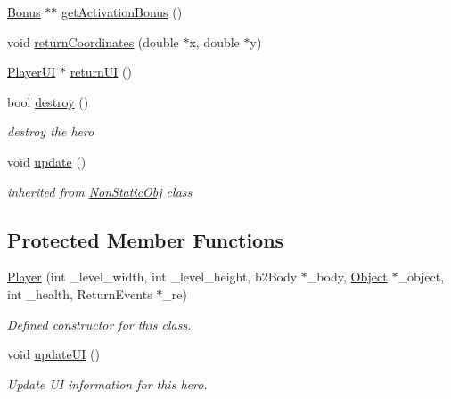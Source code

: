 \begin{DoxyCompactItemize}
\hyperlink{class_bonus}{Bonus} $\ast$$\ast$ \hyperlink{class_player_ab62b84f866fb3075bfbf8ea455d73375}{get\+Activation\+Bonus} ()
\item 
void \hyperlink{class_player_ab3d8dc6872a9903ea2717b57d77790a3}{return\+Coordinates} (double $\ast$x, double $\ast$y)
\item 
\hyperlink{class_player_u_i}{Player\+UI} $\ast$ \hyperlink{class_player_aefa23e8642f25b0f7e72543599d567f6}{return\+UI} ()
\item 
\mbox{\label{class_player_ad4d4b9138657ce9cde8433a44b1c4225}} 
bool \hyperlink{class_player_ad4d4b9138657ce9cde8433a44b1c4225}{destroy} ()
\begin{DoxyCompactList}\small\item\em destroy the hero \end{DoxyCompactList}\item 
\mbox{\label{class_player_a82c3476f3e65a4e2ac6bcd040771bdd4}} 
void \hyperlink{class_player_a82c3476f3e65a4e2ac6bcd040771bdd4}{update} ()
\begin{DoxyCompactList}\small\item\em inherited from \hyperlink{class_non_static_obj}{Non\+Static\+Obj} class \end{DoxyCompactList}\end{DoxyCompactItemize}
\subsection*{Protected Member Functions}
\begin{DoxyCompactItemize}
\item 
\hyperlink{class_player_abf1330c477ecd5d2c0154a4876cf4154}{Player} (int \+\_\+level\+\_\+width, int \+\_\+level\+\_\+height, b2\+Body $\ast$\+\_\+body, \hyperlink{class_object}{Object} $\ast$\+\_\+object, int \+\_\+health, Return\+Events $\ast$\+\_\+re)
\begin{DoxyCompactList}\small\item\em Defined constructor for this class. \end{DoxyCompactList}\item 
\mbox{\label{class_player_add3d6c730bb80c4d3a125e41d5586007}} 
void \hyperlink{class_player_add3d6c730bb80c4d3a125e41d5586007}{update\+UI} ()
\begin{DoxyCompactList}\small\item\em Update UI information for this hero. \end{DoxyCompactList}\end{DoxyCompactItemize}
